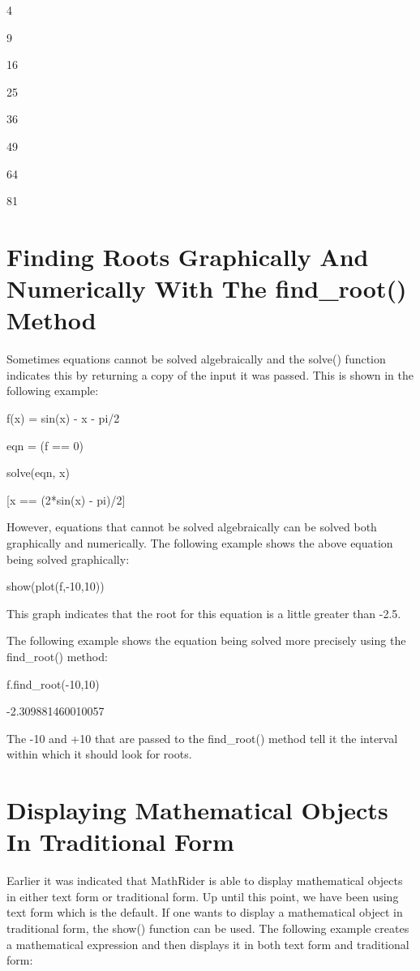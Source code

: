 \documentclass[12pt,oneside]{book}
\begin{document}
4

9

16

25

36

49

64

81

\section[Finding Roots Graphically And Numerically With The find\_root() Method]{Finding Roots Graphically And Numerically With The find\_root() Method}

Sometimes equations cannot be solved algebraically and the solve() function indicates this by returning a copy of the input it was passed. This is shown in the following example: 

f(x) = sin(x) {}- x {}- pi/2

eqn = (f == 0)

solve(eqn, x)

{\textbar}

[x == (2*sin(x) {}- pi)/2]


However, equations that cannot be solved algebraically can be solved both graphically and numerically. The following example shows the above equation being solved graphically: 

show(plot(f,{}-10,10))

{\textbar}


This graph indicates that the root for this equation is a little greater than {}-2.5. 

The following example shows the equation being solved more precisely using the find\_root() method: 

f.find\_root({}-10,10)

{\textbar}

{}-2.309881460010057


The {}-10 and +10 that are passed to the find\_root() method tell it the interval within which it should look for roots.

\section[Displaying Mathematical Objects In Traditional Form]{Displaying Mathematical Objects In Traditional Form}

Earlier it was indicated that MathRider is able to display mathematical objects in either text form or traditional form. Up until this point, we have been using text form which is the default. If one wants to display a mathematical object in traditional form, the show() function can be used. The following example creates a mathematical expression and then displays it in both text form and traditional form: 
\end{document}
